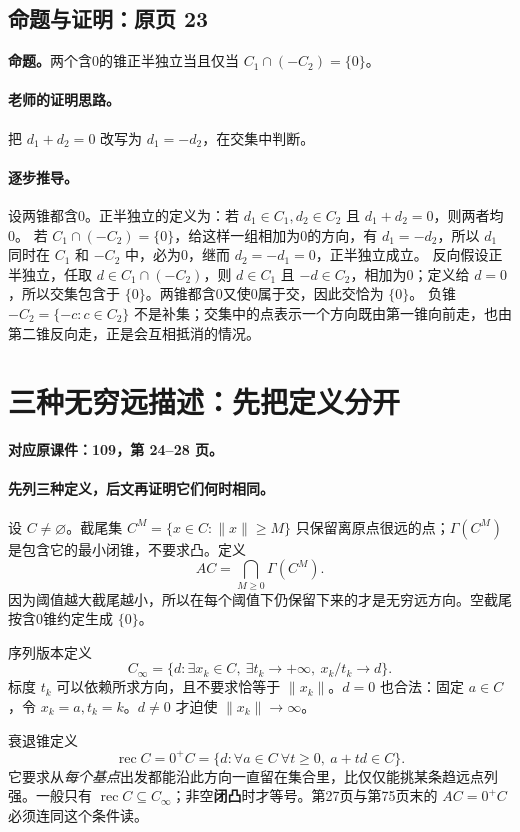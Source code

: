 \subsection{命题与证明：原页 23}

\textbf{命题。}两个含0的锥正半独立当且仅当 $C_1\cap(-C_2)=\{0\}$。

\paragraph{老师的证明思路。}把 $d_1+d_2=0$ 改写为 $d_1=-d_2$，在交集中判断。

\paragraph{逐步推导。}
设两锥都含0。正半独立的定义为：若 $d_1\in C_1,d_2\in C_2$ 且 $d_1+d_2=0$，则两者均0。
若 $C_1\cap(-C_2)=\{0\}$，给这样一组相加为0的方向，有 $d_1=-d_2$，所以 $d_1$ 同时在 $C_1$ 和 $-C_2$ 中，必为0，继而 $d_2=-d_1=0$，正半独立成立。
反向假设正半独立，任取 $d\in C_1\cap(-C_2)$，则 $d\in C_1$ 且 $-d\in C_2$，相加为0；定义给 $d=0$，所以交集包含于 $\{0\}$。两锥都含0又使0属于交，因此交恰为 $\{0\}$。
负锥 $-C_2=\{-c:c\in C_2\}$ 不是补集；交集中的点表示一个方向既由第一锥向前走，也由第二锥反向走，正是会互相抵消的情况。


\clearpage\section{三种无穷远描述：先把定义分开}\label{g:109:24}

\textbf{对应原课件：109，第 24--28 页。}


\paragraph{先列三种定义，后文再证明它们何时相同。}
设 $C\ne\varnothing$。截尾集 $C^M=\{x\in C:\|x\|\ge M\}$ 只保留离原点很远的点；$\Gamma(C^M)$ 是包含它的最小闭锥，不要求凸。定义
\[AC=\bigcap_{M\ge0}\Gamma(C^M).
\]
因为阈值越大截尾越小，所以在每个阈值下仍保留下来的才是无穷远方向。空截尾按含0锥约定生成 $\{0\}$。

序列版本定义
\[C_\infty=\{d:\exists x_k\in C,\ \exists t_k\to+\infty,\ x_k/t_k\to d\}.
\]
标度 $t_k$ 可以依赖所求方向，且不要求恰等于 $\|x_k\|$。$d=0$ 也合法：固定 $a\in C$，令 $x_k=a,t_k=k$。$d\ne0$ 才迫使 $\|x_k\|\to\infty$。

衰退锥定义
\[\operatorname{rec}C=0^+C=\{d:\forall a\in C\ \forall t\ge0,\ a+td\in C\}.
\]
它要求从\emph{每个基点}出发都能沿此方向一直留在集合里，比仅仅能挑某条趋远点列强。一般只有 $\operatorname{rec}C\subseteq C_\infty$；非空\textbf{闭凸}时才等号。第27页与第75页末的 $AC=0^+C$ 必须连同这个条件读。
